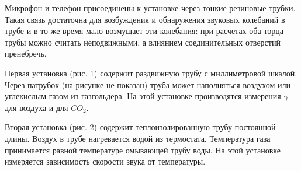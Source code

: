 \documentclass[11pt,a4paper,oneside]{article}
\begin{document}
	Микрофон и телефон присоединены к установке через тонкие резиновые трубки. Такая связь достаточна для возбуждения и обнаружения звуковых колебаний в трубе и в то же время мало возмущает эти колебания: при расчетах оба торца трубы можно считать неподвижными, а влиянием соединительных отверстий пренебречь.

	Первая установка (рис. 1) содержит раздвижную трубу с миллиметровой шкалой. Через патрубок (на рисунке не показан) труба может наполняться воздухом или углекислым газом из газгольдера. На этой установке производятся измерения $\gamma$ для воздуха и для $CO_2$.
	
	Вторая установка (рис. 2) содержит теплоизолированную трубу постоянной длины. Воздух в трубе нагревается водой из термостата. Температура газа принимается равной температуре омывающей трубу воды. На этой установке измеряется зависимость скорости звука от температуры.

	\newpage
\end{document}
